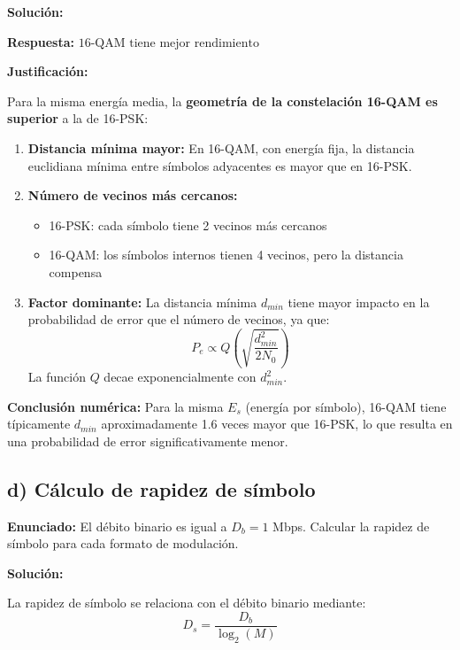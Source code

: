 \documentclass[11pt,a4paper]{article}
\begin{document}
\vspace{0.3cm}
\textbf{Soluci\'on:}

\textbf{Respuesta:} $\boxed{\text{16-QAM tiene mejor rendimiento}}$

\textbf{Justificaci\'on:}

Para la misma energ\'ia media, la \textbf{geometr\'ia de la constelaci\'on 16-QAM es superior} a la de 16-PSK:

\begin{enumerate}
    \item \textbf{Distancia m\'inima mayor:} En 16-QAM, con energ\'ia fija, la distancia euclidiana m\'inima entre s\'imbolos adyacentes es mayor que en 16-PSK.
    
    \item \textbf{N\'umero de vecinos m\'as cercanos:} 
    \begin{itemize}
        \item 16-PSK: cada s\'imbolo tiene 2 vecinos m\'as cercanos
        \item 16-QAM: los s\'imbolos internos tienen 4 vecinos, pero la distancia compensa
    \end{itemize}
    
    \item \textbf{Factor dominante:} La distancia m\'inima $d_{min}$ tiene mayor impacto en la probabilidad de error que el n\'umero de vecinos, ya que:
    \[
    P_e \propto Q\left(\sqrt{\frac{d_{min}^2}{2N_0}}\right)
    \]
    La funci\'on $Q$ decae exponencialmente con $d_{min}^2$.
\end{enumerate}

\textbf{Conclusi\'on num\'erica:} Para la misma $E_s$ (energ\'ia por s\'imbolo), 16-QAM tiene t\'ipicamente $d_{min}$ aproximadamente 1.6 veces mayor que 16-PSK, lo que resulta en una probabilidad de error significativamente menor.



\subsection*{d) C\'alculo de rapidez de s\'imbolo}

\textbf{Enunciado:} El d\'ebito binario es igual a $D_b = 1$ Mbps. Calcular la rapidez de s\'imbolo para cada formato de modulaci\'on.

\vspace{0.3cm}
\textbf{Soluci\'on:}

La rapidez de s\'imbolo se relaciona con el d\'ebito binario mediante:
\[
D_s = \frac{D_b}{\log_2(M)}
\]
\end{document}
